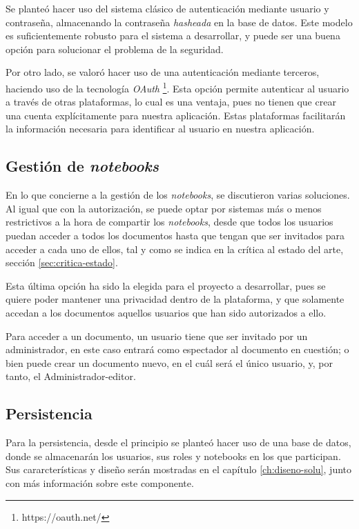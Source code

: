 \documentclass[11pt,spanish,listoffigures]{tfgetsinf}
\begin{document}
Se planteó hacer uso del sistema clásico de autenticación mediante usuario y contraseña, almacenando la contraseña \textit{\gls{hash}eada} en la base de datos. Este modelo es suficientemente robusto para el sistema a desarrollar, y puede ser una buena opción para solucionar el problema de la seguridad.

Por otro lado, se valoró hacer uso de una autenticación mediante terceros, haciendo uso de la tecnología \textit{OAuth} \footnote{https://oauth.net/}. Esta opción permite autenticar al usuario a través de otras plataformas, lo cual es una ventaja, pues no tienen que crear una cuenta explícitamente para nuestra aplicación. Estas plataformas facilitarán la información necesaria para identificar al usuario en nuestra aplicación.


\subsection{Gestión de \textit{notebooks}}
\label{subsec:comparticion}

En lo que concierne a la gestión de los \textit{notebooks}, se discutieron varias soluciones. Al igual que con la autorización, se puede optar por sistemas más o menos restrictivos a la hora de compartir los \textit{notebooks}, desde que todos los usuarios puedan acceder a todos los documentos hasta que tengan que ser invitados para acceder a cada uno de ellos, tal y como se indica en la crítica al estado del arte, sección \ref{sec:critica-estado}.

Esta última opción ha sido la elegida para el proyecto a desarrollar, pues se quiere poder mantener una privacidad dentro de la plataforma, y que solamente accedan a los documentos aquellos usuarios que han sido autorizados a ello.

Para acceder a un documento, un usuario tiene que ser invitado por un administrador, en este caso entrará como espectador al documento en cuestión; o bien puede crear un documento nuevo, en el cuál será el único usuario, y, por tanto, el Administrador-editor.


\subsection{Persistencia}
\label{subsec:persistencia}

Para la persistencia, desde el principio se planteó hacer uso de una base de datos, donde se almacenarán los usuarios, sus roles y notebooks en los que participan. Sus cararcterísticas y diseño serán mostradas en el capítulo \ref{ch:diseno-solu}, junto con más información sobre este componente.
\end{document}
